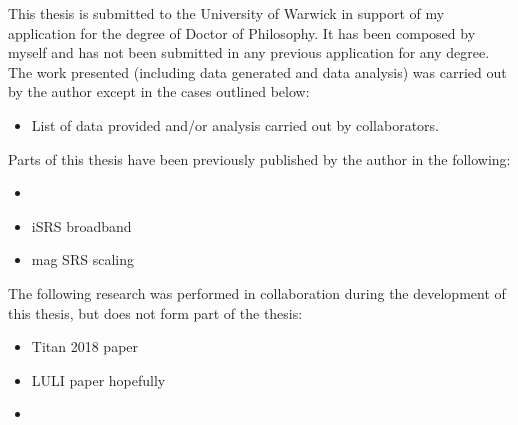 
\begin{thesisdeclaration}
%

This thesis is submitted to the University of Warwick in support of my application for the degree of Doctor of Philosophy. It has been composed by myself and has not been submitted in any previous application for any degree. \\


\noindent The work presented (including data generated and data analysis) was carried out by the author except in the cases outlined below:
\begin{singlespacing}
\begin{itemize}
    \item List of data provided and/or analysis carried out by collaborators.
\end{itemize}{}
\end{singlespacing}

\noindent Parts of this thesis have been previously published by the author in the following:
\begin{singlespacing}
\begin{itemize}
    \item {}
    \item iSRS broadband
    \item mag SRS scaling
\end{itemize}{}
\end{singlespacing}

\noindent The following research was performed in collaboration during the development of this thesis, but does not form part of the thesis:
\begin{singlespacing}
\begin{itemize}
    \item Titan 2018 paper
    \item LULI paper hopefully
    \item {}

\end{itemize}
\end{singlespacing}

\end{thesisdeclaration}
